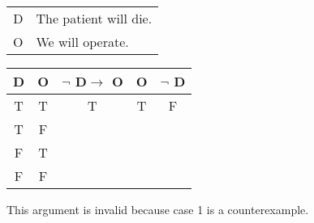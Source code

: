 \begin{tabular}{r l}
    D & The patient will die. \\
    O & We will operate.
\end{tabular}

\begin{tabular}{c|c||c|c||c}
    D & O & $\lnot$ D$\rightarrow$ O & O & $\lnot$ D \\
    \hline
    T & T & T & T & F \\
    T & F &   &   &   \\
    F & T &   &   &   \\
    F & F &   &   &  
\end{tabular}

\noindent This argument is invalid because case 1 is a counterexample.